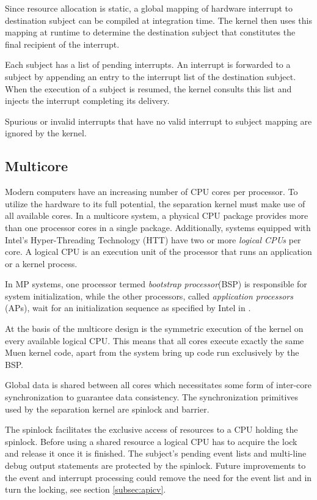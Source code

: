 Since resource allocation is static, a global mapping of hardware interrupt to
destination subject can be compiled at integration time. The kernel then uses
this mapping at runtime to determine the destination subject that constitutes
the final recipient of the interrupt.

Each subject has a list of pending interrupts. An interrupt is forwarded to a
subject by appending an entry to the interrupt list of the destination subject.
When the execution of a subject is resumed, the kernel consults this list and
injects the interrupt completing its delivery.

Spurious or invalid interrupts that have no valid interrupt to subject mapping
are ignored by the kernel.

\subsection{Multicore}\label{subsec:multicore}
Modern computers have an increasing number of CPU cores per processor. To
utilize the hardware to its full potential, the separation kernel must make use
of all available cores. In a multicore system, a physical CPU package provides
more than one processor cores in a single package. Additionally, systems
equipped with Intel's Hyper-Threading Technology (HTT) have two or more
\emph{logical CPUs} per core. A logical CPU is an execution unit of the
processor that runs an application or a kernel process.

In MP systems, one processor termed \emph{bootstrap processor}(BSP) is responsible for system initialization, while the other
processors, called \emph{application processors}
(APs), wait for an initialization sequence as specified by Intel in
\cite{intel:mp}.

At the basis of the multicore design is the symmetric execution of the kernel on
every available logical CPU. This means that all cores execute exactly the same
Muen kernel code, apart from the system bring up code run exclusively by the
BSP.

Global data is shared between all cores which necessitates some form of
inter-core synchronization to guarantee data consistency. The synchronization
primitives used by the separation kernel are spinlock and barrier.

The spinlock facilitates the exclusive access of resources to a CPU holding the
spinlock. Before using a shared resource a logical CPU has to acquire the lock
and release it once it is finished. The subject's pending event lists and
multi-line debug output statements are protected by the spinlock. Future
improvements to the event and interrupt processing could remove the need for the
event list and in turn the locking, see section \ref{subsec:apicv}.

